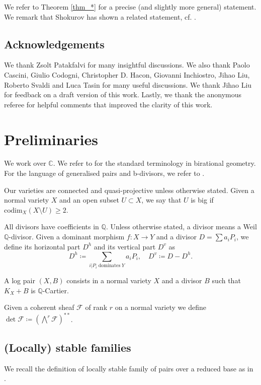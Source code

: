 \documentclass[12pt]{amsart}
\theoremstyle{plain}
\theoremstyle{definition}
\def\QQ{\mathbb Q}
\def\det{\operatorname{det}}
\def\rar{\rightarrow}
\begin{document}
We refer to Theorem \ref{thm_*} for a precise (and slightly more general) statement.
We remark that Shokurov has shown a related statement, cf. \cite[Corollary 2]{shokurov2021log}.



\subsection*{Acknowledgements}
We thank Zsolt Patakfalvi for many insightful discussions. 
We also thank Paolo Cascini, Giulio Codogni, 
Christopher D. Hacon, Giovanni Inchiostro, Jihao Liu, 
Roberto Svaldi and
Luca Tasin
for many useful discussions. We thank Jihao Liu for feedback on a draft version of this work.
Lastly, we thank the anonymous referee for helpful comments that improved the clarity of this work.


\section{Preliminaries}


We work over $\mathbb C$.
We refer to \cite{KM98} for the standard terminology in birational geometry.
For the language of generalised pairs and b-divisors, we refer to \cite{FS20}.


Our varieties are connected and quasi-projective
unless otherwise stated.
Given a normal variety $X$ and an open subset $U \subset X$, we say that $U$ is big if $\mathrm{codim}_X(X \setminus U) \geq 2$.


All divisors have coefficients in $\QQ$.
Unless otherwise stated, a divisor means a Weil $\QQ$-divisor.
Given a dominant morphism $f \colon X \rar Y$ and a divisor $D=\sum a_i P_i$, we define its horizontal part 
$D^h$ and its vertical part $D^v$ as
\[
D^h \coloneqq \sum_{i|P_i\;\mathrm{dominates}\;Y}a_i P_i, \quad D^v \coloneqq D-D^h.
\]

A log pair $(X, B)$ consists in a normal variety $X$ and a divisor $B$ such that $K_X+B$ is $\mathbb Q$-Cartier.


Given a coherent sheaf $\mathcal F$ of rank $r$ on a normal variety we define 
$\det \mathcal F \coloneqq (\bigwedge^r \mathcal F)^{**}$.

\subsection{(Locally) stable families}


We recall the definition of locally stable family of pairs over a reduced base as in 
\cite[Definition-Theorem 4.7]{Kollar21}.
\end{document}
